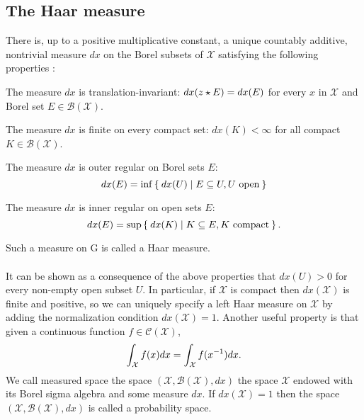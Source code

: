 \subsection{The Haar measure}
\begin{definition}
There is, up to a positive multiplicative constant, a unique countably additive, nontrivial measure $dx$ on the Borel subsets of $\mathcal{X}$ satisfying the following properties :
\begin{propenum}
\item The measure $dx$ is translation-invariant: $dx(z\star E) = dx(E)$ for every $x$ in $\mathcal{X}$ and Borel set $E\in\mathcal{B}(\mathcal{X})$.
\item The measure $dx$ is finite on every compact set: $dx(K) < \infty$ for all compact $K\in\mathcal{B}(\mathcal{X})$.
\item The measure $dx$ is outer regular on Borel sets $E$:
\begin{dmath*}
dx(E)=\inf \Set{dx(U) | E\subseteq U, U \text{ open}}
\end{dmath*}
\item The measure $dx$ is inner regular on open sets $E$:
\begin{dmath*}
dx (E)=\sup\Set{dx (K) | K\subseteq E, K {\text{ compact}}}.
\end{dmath*}
\end{propenum}
\end{definition}
Such a measure on G is called a Haar measure.
\paragraph{}
It can be shown as a consequence of the above properties that $dx(U) > 0$ for every non-empty open subset $U$. In particular, if $\mathcal{X}$ is compact then $dx(\mathcal{X})$ is finite and positive, so we can uniquely specify a left Haar measure on $\mathcal{X}$ by adding the normalization condition $dx(\mathcal{X})=1$. Another useful property is that given a continuous function $f\in\mathcal{C}(\mathcal{X})$,
\begin{dmath*}
\int_{\mathcal{X}}f(x)dx=\int_{\mathcal{X}}f(\inv{x})dx.
\end{dmath*}
We call measured space the space $(\mathcal{X},\mathcal{B}(\mathcal{X}),dx)$ the space $\mathcal{X}$ endowed with its Borel sigma algebra and some measure $dx$. If $dx(\mathcal{X})=1$ then the space $(\mathcal{X},\mathcal{B}(\mathcal{X}),dx)$ is called a probability space.
